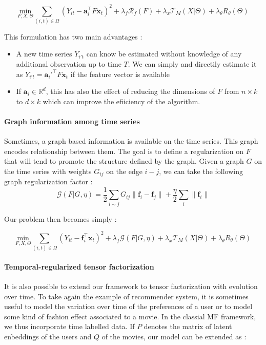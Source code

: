 \documentclass{article}
\begin{document}
\begin{equation}
\underset{F,X,\Theta}{\text{min}} \sum_{(i,t) \in \Omega} (Y_{it} - \mathbf{a}_i^\top F \mathbf{x}_t)^2 + \lambda_f \mathcal{R}_f(F) + \lambda_x \mathcal{T}_M(X | \Theta) + \lambda_{\theta} R_{\theta}(\Theta)
\label{eq:model_feature}
\end{equation}

This formulation has two main advantages :
\begin{itemize}
\item A new time series $Y_{i't}$ can know be estimated without knowledge of any additional observation up to time $T$. We can simply and directily estimate it as $Y_{i't} = \mathbf{a}_i'^\top F \mathbf{x}_t$ if the feature vector is available
\item If $\mathbf{a}_i \in \mathbb{R}^d$, this has also the effect of reducing the dimensions of $F$ from $n \times k$ to $d \times k$ which can improve the efiiciency of the algorithm.
\end{itemize}

\paragraph{Graph information among time series}
Sometimes, a graph based information is available on the time series. This graph encodes relationship between them. The goal is to define a regularization on $F$ that will tend to promote the structure defined by the graph.
Given a graph $G$ on the time series with weights $G_{ij}$ on the edge $i-j$, we can take the following graph regularization factor :
$$\mathcal{G}(F|G,\eta) = \frac{1}{2}\sum_{i\sim j}G_{ij}\|\mathbf{f}_i - \mathbf{f}_j\| + \frac{\eta}{2}\sum_i \|\mathbf{f}_i\|$$

Our problem then becomes simply :

\begin{equation}
\underset{F,X,\Theta}{\text{min}} \sum_{(i,t) \in \Omega} (Y_{it} - \mathbf{f}_i^\top\mathbf{x}_t)^2 + \lambda_f \mathcal{G}(F|G,\eta) + \lambda_x \mathcal{T}_M(X | \Theta) + \lambda_{\theta} R_{\theta}(\Theta)
\label{eq:model_graph}
\end{equation}

\paragraph{Temporal-regularized tensor factorization}
It is also possible to extend our framework to tensor factorization with evolution over time. To take again the example of recommender system, it is sometimes useful to model the variation over time of the preferences of a user or to model some kind of fashion effect associated to a movie. In the classial MF framework, we thus incorporate time labelled data. If $P$ denotes the matrix of latent enbeddings of the users and $Q$ of the movies, our model can be extended as :
\end{document}
